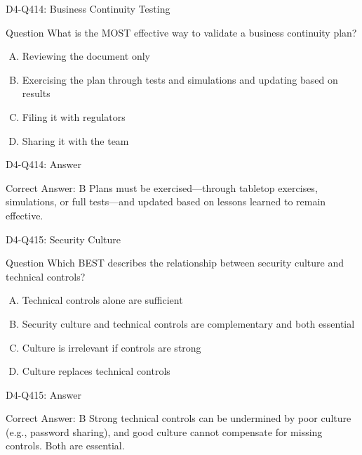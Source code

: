 \documentclass{beamer}
\begin{document}
\begin{frame}{D4-Q414: Business Continuity Testing}
	\begin{block}{Question}
		What is the MOST effective way to validate a business continuity plan?
	\end{block}
	\begin{enumerate}[(A)]
		\item Reviewing the document only
		\item Exercising the plan through tests and simulations and updating based on results
		\item Filing it with regulators
		\item Sharing it with the team
	\end{enumerate}
\end{frame}
\begin{frame}{D4-Q414: Answer}
	\begin{block}{Correct Answer: B}
		Plans must be exercised—through tabletop exercises, simulations, or full tests—and updated based on lessons learned to remain effective.
	\end{block}
\end{frame}

\begin{frame}{D4-Q415: Security Culture}
	\begin{block}{Question}
		Which BEST describes the relationship between security culture and technical controls?
	\end{block}
	\begin{enumerate}[(A)]
		\item Technical controls alone are sufficient
		\item Security culture and technical controls are complementary and both essential
		\item Culture is irrelevant if controls are strong
		\item Culture replaces technical controls
	\end{enumerate}
\end{frame}
\begin{frame}{D4-Q415: Answer}
	\begin{block}{Correct Answer: B}
		Strong technical controls can be undermined by poor culture (e.g., password sharing), and good culture cannot compensate for missing controls. Both are essential.
	\end{block}
\end{frame}


\end{document}
